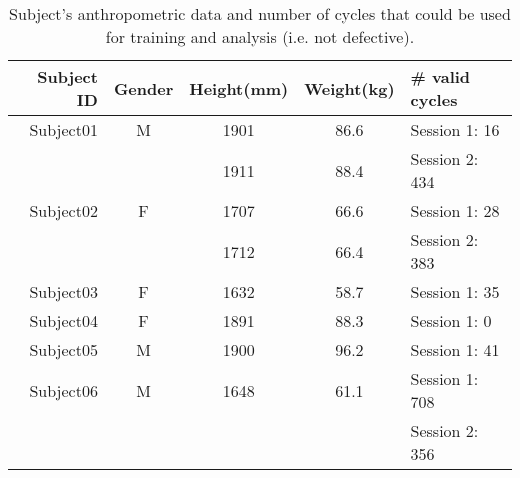 \begin{table}[ht!]
    \centering
    \caption{Subject's anthropometric data and number of cycles that could be used for training and analysis (i.e. not defective).}
    \label{tab:subject-table}
    \small
    \begin{tabular}{r | c c c | l}
        Subject ID  & Gender    & Height(mm)   & Weight(kg)     & \# valid cycles\\ \hline
        Subject01   & M         & 1901          & 86.6          & Session 1: 16 \\
                    &           & 1911          & 88.4          & Session 2: 434 \\ \hline
        Subject02   & F         & 1707          & 66.6          & Session 1: 28 \\
                    &           & 1712          & 66.4          & Session 2: 383 \\ \hline
        Subject03   & F         & 1632          & 58.7          & Session 1: 35 \\ \hline
        Subject04   & F         & 1891          & 88.3          & Session 1: 0 \\ \hline
        Subject05   & M         & 1900          & 96.2          & Session 1: 41 \\ \hline
        Subject06   & M         & 1648          & 61.1          & Session 1: 708 \\
                    &           &               &               & Session 2: 356 \\ \hline
    \end{tabular}
\end{table}
